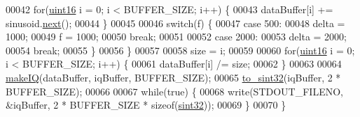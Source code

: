 \begin{DoxyCode}
00042         \textcolor{keywordflow}{for}(\hyperlink{definitions_8hpp_a05f6b0ae8f6a6e135b0e290c25fe0e4e}{uint16} i = 0; i < BUFFER\_SIZE; i++) \{
00043             dataBuffer[i] += sinusoid.\hyperlink{classradio_1_1Sinusoid_aab44298ea1bd5cb175d5826243cf56f2}{next}();
00044         \}
00045 
00046         \textcolor{keywordflow}{switch}(f) \{
00047             \textcolor{keywordflow}{case} 500:
00048                 delta = 1000;
00049                 f = 1000;
00050                 \textcolor{keywordflow}{break};
00051 
00052             \textcolor{keywordflow}{case} 2000:
00053                 delta = 2000;
00054                 \textcolor{keywordflow}{break};
00055         \}
00056     \}
00057 
00058     size = i;
00059     
00060     \textcolor{keywordflow}{for}(\hyperlink{definitions_8hpp_a05f6b0ae8f6a6e135b0e290c25fe0e4e}{uint16} i = 0; i < BUFFER\_SIZE; i++) \{
00061         dataBuffer[i] /= size;
00062     \}
00063     
00064     \hyperlink{namespaceradio_a7166522e76ff88e8d482491b1b6e2275}{makeIQ}(dataBuffer, iqBuffer, BUFFER\_SIZE);
00065     \hyperlink{namespaceradio_ae4b2334c4366dcdf0311ad79d2067945}{to\_sint32}(iqBuffer, 2 * BUFFER\_SIZE);
00066 
00067     \textcolor{keywordflow}{while}(\textcolor{keyword}{true}) \{
00068         write(STDOUT\_FILENO, &iqBuffer, 2 * BUFFER\_SIZE * \textcolor{keyword}{sizeof}(\hyperlink{definitions_8hpp_a0573de65958b4fda3a0460ed417dafb8}{sint32}));
00069     \}
00070 \}
\end{DoxyCode}
